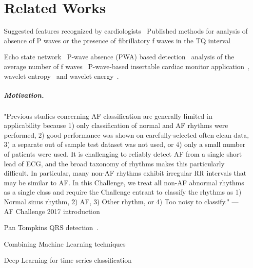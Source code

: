 \chapter{Related Works}


Suggested features recognized by cardiologists~\cite{reiffel2010practice}
Published methods for analysis of absence of P waves or the presence of fibrillatory f waves in the TQ interval

Echo state network~\cite{petrenas2012echo}
P-wave absence (PWA) based detection~\cite{ladavich2015rate}
analysis of the average number of f waves~\cite{du2014novel}
P-wave-based insertable cardiac monitor application~\cite{purerfellner2014p},
wavelet entropy~\cite{alcaraz2006wavelet, rodenas2015wavelet} and wavelet energy~\cite{garcia2016application}.

\paragraph{Motivation.}
"Previous studies concerning AF classification are generally limited in applicability because 1) only classification of normal and AF rhythms were performed, 2) good performance was shown on carefully-selected often clean data, 3) a separate out of sample test dataset was not used, or 4) only a small number of patients were used. It is challenging to reliably detect AF from a single short lead of ECG, and the broad taxonomy of rhythms makes this particularly difficult. In particular, many non-AF rhythms exhibit irregular RR intervals that may be similar to AF. In this Challenge, we treat all non-AF abnormal rhythms as a single class and require the Challenge entrant to classify the rhythms as 1) Normal sinus rhythm, 2) AF, 3) Other rhythm, or 4) Too noisy to classify." --- AF Challenge 2017 introduction

Pan Tompkins QRS detection~\cite{waser2013removing}.

Combining Machine Learning techniques~\cite{geurts2001pattern}

Deep Learning for time series classification~\cite{langkvist2014review, wang2016time}

